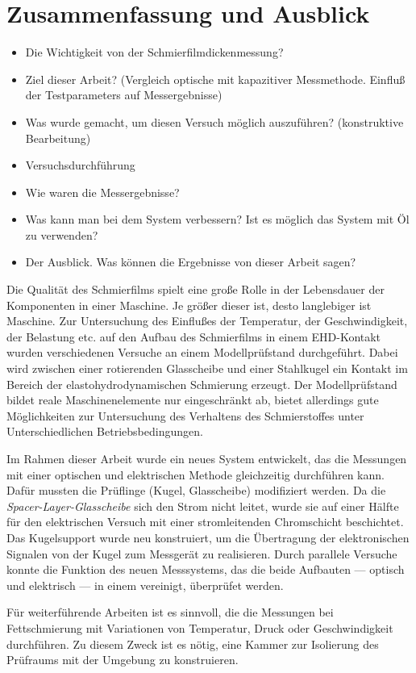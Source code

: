 \chapter{Zusammenfassung und Ausblick}
\label{zusammenfassung_und_ausblick}

\begin{itemize}
    \item Die Wichtigkeit von der Schmierfilmdickenmessung?
    \item Ziel dieser Arbeit? (Vergleich optische mit kapazitiver Messmethode. Einfluß der Testparameters auf Messergebnisse)
    \item Was wurde gemacht, um diesen Versuch möglich auszuführen? (konstruktive Bearbeitung)
    \item Versuchsdurchführung
    \item Wie waren die Messergebnisse?
    \item Was kann man bei dem System verbessern? Ist es möglich das System mit Öl zu verwenden?
    \item Der Ausblick. Was können die Ergebnisse von dieser Arbeit sagen?
\end{itemize}

Die Qualität des Schmierfilms spielt eine große Rolle in der Lebensdauer der Komponenten in einer Maschine.
Je größer dieser ist, desto langlebiger ist Maschine.
Zur Untersuchung des Einflußes der Temperatur, der Geschwindigkeit, der Belastung etc. auf den Aufbau des Schmierfilms in einem EHD-Kontakt wurden verschiedenen Versuche an einem Modellprüfstand durchgeführt.
Dabei wird zwischen einer rotierenden Glasscheibe und einer Stahlkugel ein Kontakt im Bereich der elastohydrodynamischen Schmierung erzeugt.
Der Modellprüfstand bildet reale Maschinenelemente nur eingeschränkt ab, bietet allerdings gute Möglichkeiten zur Untersuchung des Verhaltens des Schmierstoffes unter Unterschiedlichen Betriebsbedingungen.

Im Rahmen dieser Arbeit wurde ein neues System entwickelt, das die Messungen mit einer optischen und elektrischen Methode gleichzeitig durchführen kann.
Dafür mussten die Prüflinge (Kugel, Glasscheibe) modifiziert werden.
Da die \textit{Spacer-Layer-Glasscheibe} sich den Strom nicht leitet, wurde sie auf einer Hälfte für den elektrischen Versuch mit einer stromleitenden Chromschicht beschichtet.
Das Kugelsupport wurde neu konstruiert, um die Übertragung der elektronischen Signalen von der Kugel zum Messgerät zu realisieren.
Durch parallele Versuche konnte die Funktion des neuen Messsystems, das die beide Aufbauten --- optisch und elektrisch --- in einem vereinigt, überprüfet werden.


Für weiterführende Arbeiten ist es sinnvoll, die die Messungen bei Fettschmierung mit Variationen von Temperatur, Druck oder Geschwindigkeit durchführen.
Zu diesem Zweck ist es nötig, eine Kammer zur Isolierung des Prüfraums mit der Umgebung zu konstruieren.

